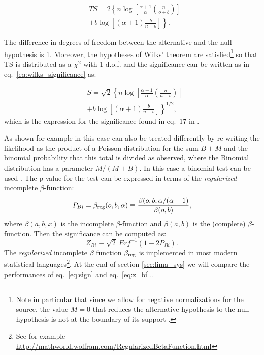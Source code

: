 \documentclass[twocolumn]{aastex61}
\renewcommand{\textbf}{}
\begin{document}
\begin{align}
& TS = 2 \left\{ n\log{\left[ \frac{\alpha + 1}{\alpha} 
\left(\frac{n}{o+b}\right)\right]} \right. \nonumber \\
& \left. + b \log{ \left[ (\alpha +1) \frac{b}{n+b} \right] } \right\}.\nonumber
\end{align}

The difference in degrees of freedom between the alternative and the  null hypothesis is 1. Moreover, the hypotheses of Wilks' theorem are satisfied\footnote{Note in particular that since we allow for negative normalizations for the source, the value $M=0$ that reduces the alternative hypothesis to the null hypothesis is not at the boundary of its support \citep{Protassov}.} so that TS is distributed as a $\chi^2$ with 1 d.o.f. and the significance can be written as in eq.~\ref{eq:wilks_significance} as:

\begin{align}
& S = \sqrt{2} \left\{ n\log{\left[ \frac{\alpha + 1}{\alpha} 
\left(\frac{n}{n+b}\right)\right]} \right. \nonumber \\
& \left. + b \log{ \left[ (\alpha +1) \frac{b}{n+b} \right] } \right\}^{1/2},
\label{eq:sign}
\end{align}
which is the expression for the significance found in eq.~17 in \citet{LiMa}.

\textbf{As shown for example in \citet{Cousins2008} this case can also be treated differently by re-writing the likelihood as the product of a Poisson distribution for the sum $B + M$ and the binomial probability that this total is divided as observed, where the Binomial distribution has a parameter $M / (M+B)$. In this case a binomial test can be used \citep{Reid95,James1980,Gehrels86,Clopper94,Zhang1990}. The p-value for the test can be expressed in terms of the \textit{regularized} incomplete $\beta$-function:}
$$
P_{Bi} = \beta_{\rm reg}(o, b, \alpha) \equiv \frac{\beta (o, b, \alpha / (\alpha +1)}{\beta(o, b)},
$$
\textbf{where $\beta(a, b, x)$ is the incomplete $\beta$-function and $\beta (a, b)$ is the (complete) $\beta$-function. Then the significance can be computed as:
\begin{equation} 
Z_{Bi} \equiv \sqrt{2}~Erf^{-1}(1 - 2 P_{Bi}).
\label{eq:z_bi}
\end{equation}
The \textit{regularized} incomplete $\beta$ function $\beta_{\rm reg}$ is implemented in most modern statistical languages\footnote{See for example \url{http://mathworld.wolfram.com/RegularizedBetaFunction.html}}. At the end of section \ref{sec:lima_sys} we will compare the performances of eq.~\ref{eq:sign} and eq.~\ref{eq:z_bi}.}. 
\end{document}
